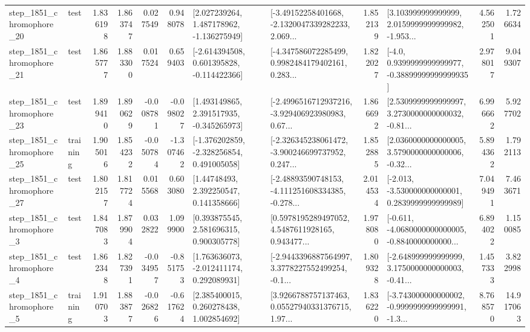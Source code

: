 \begin{tabular}{llrrrrllrlrr}
 step\_1851\_chromophore\_20 &      test &      1.836198 &    1.863747 &      0.027549 &  0.948078 &    [2.027239264, 1.487178962, -1.136275949] &  [-3.49152258401668, -2.1320047339282233, 2.069... &       1.852139 &  [3.103999999999999, 2.0159999999999982, -1.953... &            4.562501 &          1.726634 \\
 step\_1851\_chromophore\_21 &      test &      1.865777 &    1.883300 &      0.017524 &  0.659403 &   [-2.614394508, 0.601395828, -0.114422366] &  [-4.347586072285499, 0.9982484179402161, 0.283... &       1.822027 &   [-4.0, 0.9399999999999977, -0.38899999999999935] &            2.978017 &          9.049307 \\
 step\_1851\_chromophore\_23 &      test &      1.899410 &    1.890629 &     -0.008781 & -0.098027 &    [1.493149865, 2.391517935, -0.345265973] &  [-2.4996516712937216, -3.929406923980983, 0.67... &       1.866692 &  [2.5309999999999997, 3.2730000000000032, -0.81... &            6.996662 &          5.927702 \\
 step\_1851\_chromophore\_25 &  training &      1.905016 &    1.854232 &     -0.050784 & -1.307462 &   [-1.376202859, -2.328256854, 0.491005058] &  [-2.326345238061472, -3.900246699737952, 0.247... &       1.852885 &  [2.0360000000000005, 3.5790000000000006, -0.32... &            5.894362 &          1.792113 \\
 step\_1851\_chromophore\_27 &      test &      1.802157 &    1.817724 &      0.015568 &  0.603080 &      [1.44748493, 2.392250547, 0.141358666] &  [-2.48893590748153, -4.111251608334385, -0.278... &       2.014534 &   [-2.013, -3.530000000000001, 0.2839999999999989] &            7.049491 &          7.463671 \\
  step\_1851\_chromophore\_3 &      test &      1.847083 &    1.879904 &      0.032822 &  1.099900 &     [0.393875545, 2.581696315, 0.900305778] &  [0.5978195289497052, 4.5487611928165, 0.943477... &       1.978080 &  [-0.611, -4.0680000000000005, -0.8840000000000... &            6.894022 &          1.150085 \\
  step\_1851\_chromophore\_4 &      test &      1.862348 &    1.827391 &     -0.034957 & -0.851753 &    [1.763636073, -2.012411174, 0.292089931] &  [-2.9443396887564997, 3.3778227552499254, -0.1... &       1.809328 &  [-2.648999999999999, 3.1750000000000003, -0.41... &            1.457333 &          3.822998 \\
  step\_1851\_chromophore\_5 &  training &      1.910703 &    1.883877 &     -0.026826 & -0.617624 &     [2.385400015, 0.260278438, 1.002854692] &  [3.9266788757137463, 0.05527940331376715, 1.97... &       1.836220 &  [-3.743000000000002, -0.9999999999999991, -1.3... &            8.768570 &         14.917063 \\

\end{tabular}
